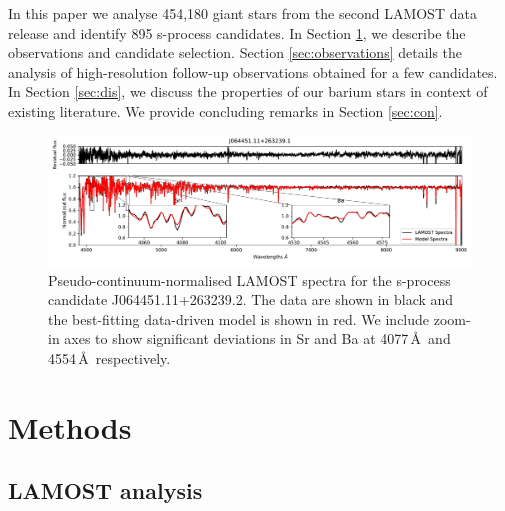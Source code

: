 \documentclass[a4paper,fleqn,usenatbib]{mnras}
\begin{document}
In this paper we analyse 454,180 giant stars from the second LAMOST data release \citep{luo2015} and identify 895 s-process candidates. In Section \ref{sec:methods}, we describe the observations and candidate selection. Section \ref{sec:observations} details the analysis of high-resolution follow-up observations obtained for a few candidates. In Section \ref{sec:dis}, we discuss the properties of our barium stars in context of existing literature. We provide concluding remarks in Section \ref{sec:con}.

\begin{figure}
	\includegraphics[width=\textwidth]{posterchild_final.pdf}
    \caption{Pseudo-continuum-normalised LAMOST spectra for the s-process candidate J064451.11+263239.2. The data are shown in black and the best-fitting data-driven model is shown in red. We include zoom-in axes to show significant deviations in Sr and Ba at  4077\,\AA\ and 4554\,\AA\, respectively.}
    \label{fig:figure1}
\end{figure}



\section{Methods} \label{sec:methods}
\subsection{LAMOST analysis}
\end{document}
